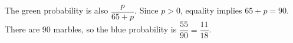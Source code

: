 The green probability is also $\dfrac{p}{65+p}$. Since $ p>0 $, equality implies $ 65+p=90 $. There are 90 marbles, so the blue probability is $\dfrac{55}{90}=\boxed{\dfrac{11}{18}}$.
